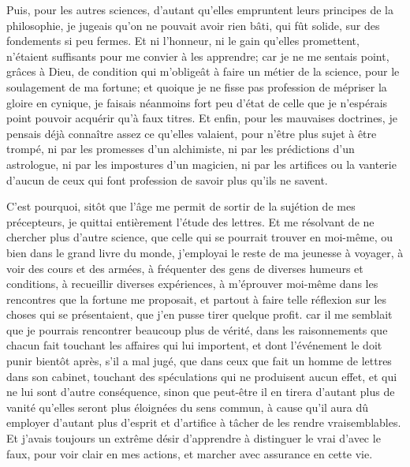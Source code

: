 \documentclass[french,twoside]{book} %
\begin{document}
Puis, pour les autres sciences, d'autant qu'elles empruntent leurs principes de la philosophie, je jugeais qu'on ne pouvait avoir rien bâti, qui fût solide, sur des fondements si peu fermes. Et ni l'honneur, ni le gain qu'elles promettent, n'étaient suffisants pour me convier à les apprendre; car je ne me sentais point, grâces à Dieu, de condition qui m'obligeât à faire un métier de la science, pour le soulagement de ma fortune; et quoique je ne fisse pas profession de mépriser la gloire en cynique, je faisais néanmoins fort peu d'état de celle que je n'espérais point pouvoir acquérir qu'à faux titres. Et enfin, pour les mauvaises doctrines, je pensais déjà connaître assez ce qu'elles valaient, pour n'être plus sujet à être trompé, ni par les promesses d'un alchimiste, ni par les prédictions d'un astrologue, ni par les impostures d'un magicien, ni par les artifices ou la vanterie d'aucun de ceux qui font profession de savoir plus qu'ils ne savent.\par
C'est pourquoi, sitôt que l'âge me permit de sortir de la sujétion de mes précepteurs, je quittai entièrement l'étude des lettres. Et me résolvant de ne chercher plus d'autre science, que celle qui se pourrait trouver en moi-même, ou bien dans le grand livre du monde, j'employai le reste de ma jeunesse à voyager, à voir des cours et des armées, à fréquenter des gens de diverses humeurs et conditions, à recueillir diverses expériences, à m'éprouver moi-même dans les rencontres que la fortune me proposait, et partout à faire telle réflexion sur les choses qui se présentaient, que j'en pusse tirer quelque profit. car il me semblait que je pourrais rencontrer beaucoup plus de vérité, dans les raisonnements que chacun fait touchant les affaires qui lui importent, et dont l'événement le doit punir bientôt après, s'il a mal jugé, que dans ceux que fait un homme de lettres dans son cabinet, touchant des spéculations qui ne produisent aucun effet, et qui ne lui sont d'autre conséquence, sinon que peut-être il en tirera d'autant plus de vanité qu'elles seront plus éloignées du sens commun, à cause qu'il aura dû employer d'autant plus d'esprit et d'artifice à tâcher de les rendre vraisemblables. Et j'avais toujours un extrême désir d'apprendre à distinguer le vrai d'avec le faux, pour voir clair en mes actions, et marcher avec assurance en cette vie.\par
\end{document}
